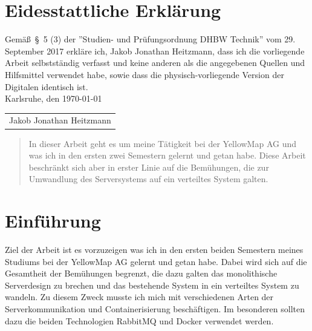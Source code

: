 \documentclass[12pt,a4paper]{article}
\begin{document}

\section*{Eidesstattliche Erkl\"arung}

Gem\"a\ss\ \S\ 5 (3) der ''Studien- und Pr\"ufungsordnung DHBW Technik'' vom 29. September 2017 erkl\"are ich, Jakob Jonathan Heitzmann, dass ich die vorliegende Arbeit selbstst\"andig verfasst und keine anderen als die angegebenen Quellen und Hilfsmittel verwendet habe, sowie dass die physisch-vorliegende Version der Digitalen identisch ist.\\
\hspace*{0.5cm}
Karlsruhe, den \today

\vspace*{2cm}

\begin{tabular}{@{}l@{}}\hline
\rule{0pt}{2ex}
Jakob Jonathan Heitzmann
\end{tabular}
\newpage


\begin{abstract}
In dieser Arbeit geht es um meine Tätigkeit bei der YellowMap AG und was ich in den ersten zwei Semestern gelernt und getan habe. Diese Arbeit beschränkt sich aber in erster Linie auf die Bemühungen, die zur Umwandlung des Serversystems auf ein verteiltes System galten.
\end{abstract}
\newpage

\tableofcontents
\newpage


\section{Einf\"uhrung}
Ziel der Arbeit ist es vorzuzeigen was ich in den ersten beiden Semestern meines Studiums bei der YellowMap AG gelernt und getan habe. Dabei wird sich auf die Gesamtheit der Bemühungen begrenzt, die dazu galten das monolithische Serverdesign zu brechen und das bestehende System in ein verteiltes System zu wandeln. Zu diesem Zweck musste ich mich mit verschiedenen Arten der Serverkommunikation und Containerisierung beschäftigen. Im besonderen sollten dazu die beiden Technologien \gls{RabbitMQ} und \gls{Docker} verwendet werden. 
\end{document}
